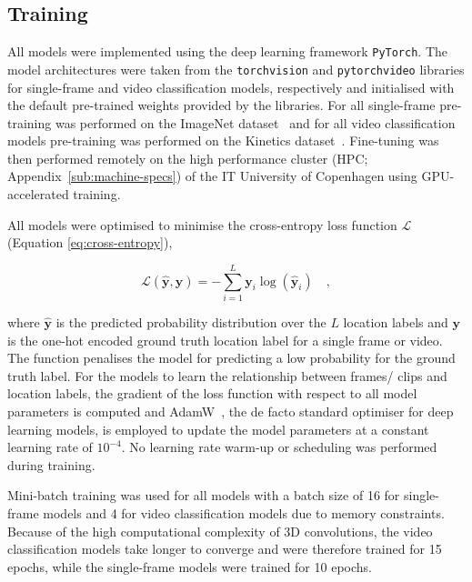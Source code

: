 \documentclass[a4paper]{article}
\begin{document}

\subsection{Training} %
\label{sub:training}

All models were implemented using the deep learning framework
\texttt{PyTorch}. The model architectures were taken from the
\texttt{torchvision} and \texttt{pytorchvideo} libraries for single-frame and
video classification models, respectively and initialised with the default
pre-trained weights provided by the libraries. For all single-frame pre-training
was performed on the ImageNet dataset~\cite{imagenet} and for all video
classification models pre-training was performed on the Kinetics
dataset~\cite{kinetics}. Fine-tuning was then performed remotely on the high
performance cluster (HPC; Appendix~\ref{sub:machine-specs}) of the IT University
of Copenhagen using GPU-accelerated training. 

All models were optimised to minimise the cross-entropy loss function
$\mathcal{L}$ (Equation \ref{eq:cross-entropy}), 

\begin{equation}
  \mathcal{L}(\hat{\mathbf{y}},\mathbf{y}) = -\sum_{i=1}^{L} \mathbf{y}_i
  \log(\hat{\mathbf{y}}_i) \quad ,
  \label{eq:cross-entropy}
\end{equation}




where $\hat{\mathbf{y}}$ is the predicted probability distribution over the $L$
location labels and $\mathbf{y}$ is the one-hot encoded ground truth location
label for a single frame or video. The function penalises the model for
predicting a low probability for the ground truth label. For the models to learn
the relationship between frames/ clips and location labels, the gradient of the
loss function with respect to all model parameters is computed and
AdamW~\cite{adamw}, the de facto standard optimiser for deep learning models, is
employed to update the model parameters at a constant learning rate of
$10^{-4}$. No learning rate warm-up or scheduling was performed during training.

Mini-batch training was used for all models with a batch size of 16 for
single-frame models and 4 for video classification models due to memory
constraints. Because of the high computational complexity of 3D convolutions,
the video classification models take longer to converge and were therefore
trained for 15 epochs, while the single-frame models were trained for 10 epochs.
\end{document}
